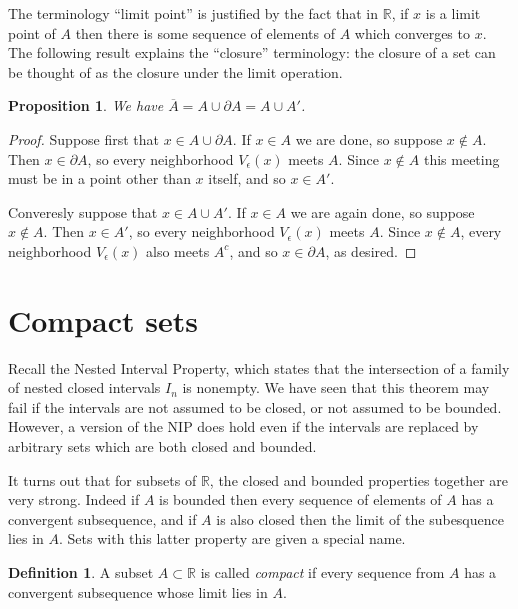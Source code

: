 \documentclass[11pt,oneside]{amsbook}
\newcommand{\RR}{\mathbb R}
\theoremstyle{definition}
\theoremstyle{plain}
\newtheorem{prop}[thm]{Proposition}
\theoremstyle{definition}
\newtheorem{defn}[thm]{Definition}
\theoremstyle{remark}
\numberwithin{equation}{section}
\numberwithin{figure}{section}
\begin{document}
The terminology ``limit point'' is justified by the fact that in $\RR$, if $x$ is a limit point of $A$ then there is some sequence of elements of $A$ which converges to $x$. The following result explains the ``closure'' terminology: the closure of a set can be thought of as the closure under the limit operation.

\begin{prop}
  \label{prop:closure-equiv}
  We have $\overline{A}=A\cup\partial A=A\cup A'$.
\end{prop}

\begin{proof}
  Suppose first that $x\in A\cup\partial A$. If $x\in A$ we are done, so suppose $x\notin A$. Then $x\in \partial A$, so every neighborhood $V_\epsilon(x)$ meets $A$. Since $x\notin A$ this meeting must be in a point other than $x$ itself, and so $x\in A'$.

  Converesly suppose that $x\in A\cup A'$. If $x\in A$ we are again done, so suppose $x\notin A$. Then $x\in A'$, so every neighborhood $V_\epsilon(x)$ meets $A$. Since $x\notin A$, every neighborhood $V_\epsilon(x)$ also meets $A^c$, and so $x\in\partial A$, as desired.
\end{proof}



\newpage
\section{Compact sets}

Recall the Nested Interval Property, which states that the intersection of a family of nested closed intervals $I_n$ is nonempty. We have seen that this theorem may fail if the intervals are not assumed to be closed, or not assumed to be bounded. However, a version of the NIP does hold even if the intervals are replaced by arbitrary sets which are both closed and bounded.

It turns out that for subsets of $\RR$, the closed and bounded properties together are very strong. Indeed if $A$ is bounded then every sequence of elements of $A$ has a convergent subsequence, and if $A$ is also closed then the limit of the subesquence lies in $A$. Sets with this latter property are given a special name.

\begin{defn}
  A subset $A\subset\RR$ is called \emph{compact} if every sequence from $A$ has a convergent subsequence whose limit lies in $A$.
\end{defn}
\end{document}
